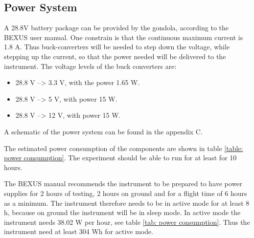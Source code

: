 \pagebreak
\subsection{Power System}
A 28.8V battery package can be provided by the gondola, according to the BEXUS user manual. One constrain is that the continuous maximum current is 1.8 A. Thus buck-converters will be needed to step down the voltage, while stepping up the current, so that the power needed will be delivered to the instrument. The voltage levels of the buck converters are: 

\begin{itemize}
	\item 28.8 V --> 3.3 V, with the power 1.65 W.
	\item 28.8 V --> 5 V, with power 15 W.
	\item 28.8 V --> 12 V, with power 15 W.
\end{itemize}

A schematic of the power system can be found in the appendix C.

The estimated power consumption of the components are shown in table \ref{table: power consumption}. The experiment should be able to run for at least for 10 hours. 


The BEXUS manual recommends the instrument to be prepared to have power supplies for 2 hours of testing, 2 hours on ground and for a flight time of 6 hours as a minimum. The instrument therefore needs to be in active mode for at least 8 h, because on ground the instrument will be in sleep mode. In active mode the instrument needs 38.02 W per hour, see table \ref{tab: power consumption}. Thus the instrument need at least 304 Wh for active mode. 





\raggedbottom
